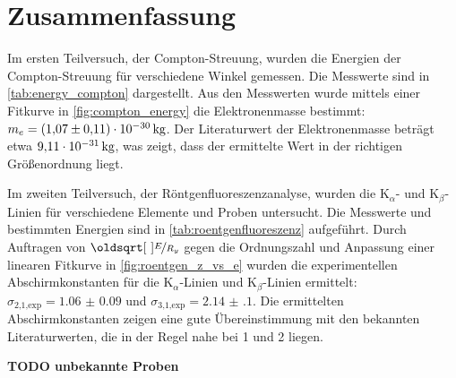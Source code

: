 \documentclass[ngerman]{scrartcl}
\begin{document}
\section{Zusammenfassung}
\label{sec:zusammenfassung}

Im ersten Teilversuch, der Compton-Streuung, wurden die Energien der Compton-Streuung für verschiedene Winkel gemessen. Die Messwerte sind in \autoref{tab:energy_compton} dargestellt. Aus den Messwerten wurde mittels einer Fitkurve in \autoref{fig:compton_energy} die Elektronenmasse bestimmt: $m_e = \SI{1.07(11)E-30}{\kilogram}$. Der Literaturwert der Elektronenmasse beträgt etwa $\SI{9.11E-31}{\kilogram}$, was zeigt, dass der ermittelte Wert in der richtigen Größenordnung liegt.

Im zweiten Teilversuch, der Röntgenfluoreszenzanalyse, wurden die K$_{\alpha}$- und K$_{\beta}$-Linien für verschiedene Elemente und Proben untersucht. Die Messwerte und bestimmten Energien sind in \autoref{tab:roentgenfluoreszenz} aufgeführt. Durch Auftragen von $\sqrt{\nicefrac{E}{R_y}}$ gegen die Ordnungszahl und Anpassung einer linearen Fitkurve in \autoref{fig:roentgen_z_vs_e} wurden die experimentellen Abschirmkonstanten für die K$_{\alpha}$-Linien und K$_{\beta}$-Linien ermittelt: $\sigma_{\text{2,1,exp}} = \num{1.06(9)}$ und $\sigma_{\text{3,1,exp}} = \num{2.14(10)}$. Die ermittelten Abschirmkonstanten zeigen eine gute Übereinstimmung mit den bekannten Literaturwerten, die in der Regel nahe bei 1 und 2 liegen.

\textbf{TODO unbekannte Proben}



\clearpage
\printbibliography

\listoffigures

\listoftables
\end{document}
